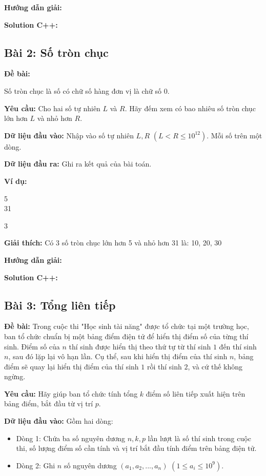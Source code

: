 \documentclass[12pt]{scrartcl}  %
\begin{document}
\textbf{Hướng dẫn giải:}

\textbf{Solution C++:}

\subsection{Bài 2: Số tròn chục}
\textbf{Đề bài:}

Số tròn chục là số có chữ số hàng đơn vị là chữ số $0$.

\textbf{Yêu cầu:}
Cho hai số tự nhiên $L$ và $R$. Hãy đếm xem có bao nhiêu số tròn chục lớn hơn $L$ và nhỏ hơn $R$.

\textbf{Dữ liệu đầu vào:}
Nhập vào số tự nhiên $L, R$ $(L < R \leq 10^{12})$. Mỗi số trên một dòng.

\textbf{Dữ liệu đầu ra:}
Ghi ra kết quả của bài toán.

\textbf{Ví dụ:}
\begin{tcolorbox}[colback=gray!5!white, colframe=blue!50!black, title=Input]
5\\
31
\end{tcolorbox}
\begin{tcolorbox}[colback=gray!5!white, colframe=green!50!black, title=Output]
3
\end{tcolorbox}

\textbf{Giải thích:}
Có 3 số tròn chục lớn hơn 5 và
nhỏ hơn 31 là: 10, 20, 30

\textbf{Hướng dẫn giải:}

\textbf{Solution C++:}

\subsection{Bài 3: Tổng liên tiếp}
\textbf{Đề bài:}
Trong cuộc thi "Học sinh tài năng" được tổ chức tại một trường học, ban tổ chức chuẩn bị một
bảng điểm điện tử để hiển thị điểm số của từng thí sinh. Điểm số của $n$ thí sinh được hiển thị theo thứ
tự từ thí sinh $1$ đến thí sinh $n$, sau đó lặp lại vô hạn lần. Cụ thể, sau khi hiển thị điểm của thí sinh $n$,
bảng điểm sẽ quay lại hiển thị điểm của thí sinh $1$ rồi thí sinh $2$, và cứ thế không ngừng.

\textbf{Yêu cầu:}
Hãy giúp ban tổ chức tính tổng $k$ điểm số liên tiếp xuất hiện trên bảng điểm, bắt đầu từ vị trí $p$.

\textbf{Dữ liệu đầu vào:}
Gồm hai dòng:
\begin{itemize}
    \item Dòng 1: Chứa ba số nguyên dương $n, k, p$ lần lượt là số thí sinh trong cuộc thi, số lượng
điểm số cần tính và vị trí bắt đầu tính điểm trên bảng điện tử.
    \item Dòng 2: Ghi $n$ số nguyên dương $(a_1, a_2, ... , a_n)$ $(1 \leq a_i \leq 10^9)$.
\end{itemize}
\end{document}
